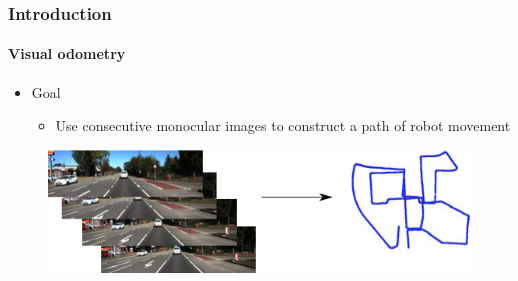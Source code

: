 \begin{frame}
    \frametitle{Introduction}
    \framesubtitle{Visual odometry}
    \begin{itemize}
        \item Goal
        \begin{itemize}
            \item Use consecutive monocular images to construct a path of robot movement
        \end{itemize}
    \end{itemize}
    \begin{figure}
        \includegraphics[scale=0.8]{images/vo-objective.png}
    \end{figure}
\end{frame}

